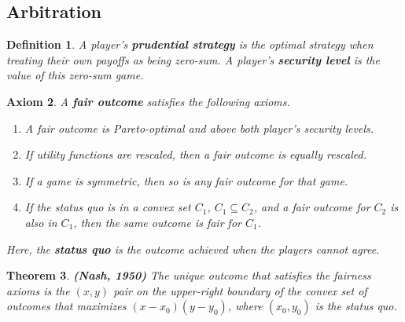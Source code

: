 \documentclass{article}
\theoremstyle{colontheorem}
\newtheorem{theorem}{Theorem}[section]
\newtheorem{definition}[theorem]{Definition}
\newtheorem{axiom}[theorem]{Axiom}
\newenvironment{Theorem}
{
	\begin{mdframed}[backgroundcolor=TheoremOrange!10]
	\begin{theorem}
}
{
	\end{theorem}
	\end{mdframed}
	
	\vspace{.15in}
}
\newenvironment{Def}
{
	\begin{mdframed}[backgroundcolor=DefGreen!10]
	\begin{definition}
}
{
	\end{definition}
	\end{mdframed}
	
	\vspace{.15in}
}
\newenvironment{Axiom}
{
	\begin{mdframed}[backgroundcolor=AxiomRed!10]
	\begin{axiom}
}
{
	\end{axiom}
	\end{mdframed}
	
	\vspace{.15in}
}
\begin{document}
\begin{center}
	\pagebreak
	
	\section{Arbitration}
	
	\vspace{.1in}
\end{center}



\begin{Def}
	
	A player's \textbf{prudential strategy} is the optimal strategy when treating their own payoffs as being zero-sum. A player's \textbf{security level} is the value of this zero-sum game.
	
\end{Def}



\begin{Axiom}
	
	A \textbf{fair outcome} satisfies the following axioms.
	
	\begin{enumerate}
		
		\item A fair outcome is Pareto-optimal and above both player's security levels.
		
		\item If utility functions are rescaled, then a fair outcome is equally rescaled.
		
		\item If a game is symmetric, then so is any fair outcome for that game.
		
		\item If the status quo is in a convex set $C_1$, $C_1 \subseteq C_2$, and a fair outcome for $C_2$ is also in $C_1$, then the same outcome is fair for $C_1$.
		
	\end{enumerate}
	
	Here, the \textbf{status quo} is the outcome achieved when the players cannot agree.
	
\end{Axiom}



\begin{Theorem}
	
	\textbf{(Nash, 1950)} The unique outcome that satisfies the fairness axioms is the $(x, y)$ pair on the upper-right boundary of the convex set of outcomes that maximizes $(x - x_0)(y - y_0)$, where $(x_0, y_0)$ is the status quo.
	
\end{Theorem}
\end{document}
